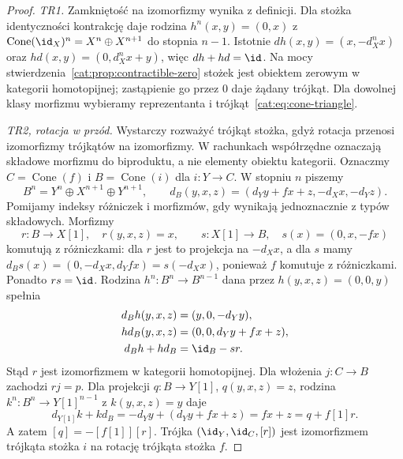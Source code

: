 \begin{proof}
\emph{TR1.} Zamkniętość na izomorfizmy wynika z definicji. Dla stożka identyczności kontrakcję daje rodzina $h^n(x,y)=(0,x)$ z $\operatorname{Cone}(\id_X)^n=X^n\oplus X^{n+1}$ do stopnia $n-1$. Istotnie $dh(x,y)=(x,-d_X^nx)$ oraz $hd(x,y)=(0,d_X^nx+y)$, więc $dh+hd=\id$. Na mocy stwierdzenia~\ref{cat:prop:contractible-zero} stożek jest obiektem zerowym w kategorii homotopijnej; zastąpienie go przez $0$ daje żądany trójkąt. Dla dowolnej klasy morfizmu wybieramy reprezentanta i trójkąt~\eqref{cat:eq:cone-triangle}.

\emph{TR2, rotacja w przód.} Wystarczy rozważyć trójkąt stożka, gdyż rotacja przenosi izomorfizmy trójkątów na izomorfizmy. W rachunkach współrzędne oznaczają składowe morfizmu do biproduktu, a nie elementy obiektu kategorii. Oznaczmy $C=\operatorname{Cone}(f)$ i $B=\operatorname{Cone}(i)$ dla $i:Y\to C$. W stopniu $n$ piszemy
\[
 B^n=Y^n\oplus X^{n+1}\oplus Y^{n+1},\qquad
 d_B(y,x,z)=(d_Yy+fx+z,-d_Xx,-d_Yz).
\]
Pomijamy indeksy różniczek i morfizmów, gdy wynikają jednoznacznie z typów składowych. Morfizmy
\[
 r:B\to X[1],\quad r(y,x,z)=x,\qquad
 s:X[1]\to B,\quad s(x)=(0,x,-fx)
\]
komutują z różniczkami: dla $r$ jest to projekcja na $-d_Xx$, a dla $s$ mamy $d_Bs(x)=(0,-d_Xx,d_Yfx)=s(-d_Xx)$, ponieważ $f$ komutuje z różniczkami. Ponadto $rs=\id$. Rodzina $h^n:B^n\to B^{n-1}$ dana przez $h(y,x,z)=(0,0,y)$ spełnia
\[
 \begin{aligned}
 d_Bh(y,x,z)&=(y,0,-d_Yy),\\
 hd_B(y,x,z)&=(0,0,d_Yy+fx+z),\\
 d_Bh+hd_B&=\id_B-sr.
\end{aligned}
\]
Stąd $r$ jest izomorfizmem w kategorii homotopijnej. Dla włożenia $j:C\to B$ zachodzi $rj=p$. Dla projekcji $q:B\to Y[1]$, $q(y,x,z)=z$, rodzina $k^n:B^n\to Y[1]^{n-1}$ z $k(y,x,z)=y$ daje
\[
 d_{Y[1]}k+kd_B=-d_Yy+(d_Yy+fx+z)=fx+z=q+f[1]r.
\]
A zatem $[q]=-[f[1]][r]$. Trójka $(\id_Y,\id_C,[r])$ jest izomorfizmem trójkąta stożka $i$ na rotację trójkąta stożka $f$.


\end{proof}
